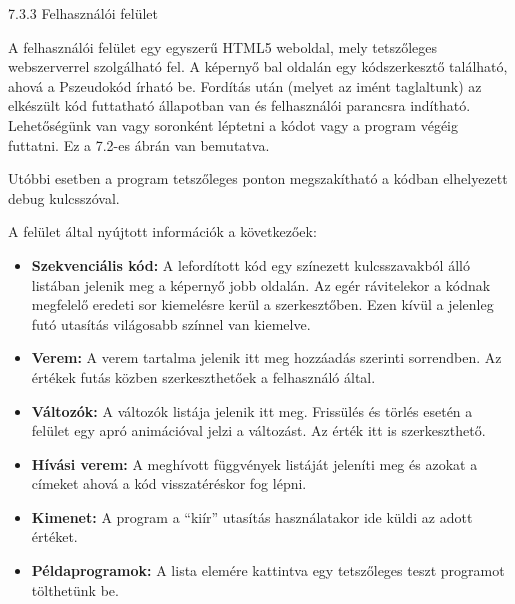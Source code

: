 7.3.3 Felhasználói felület

A felhasználói felület egy egyszerű HTML5 weboldal, mely tetszőleges webszerverrel szolgálható fel. A képernyő bal oldalán egy kódszerkesztő található, ahová a Pszeudokód írható be. Fordítás után (melyet az imént taglaltunk) az elkészült kód futtatható állapotban van és felhasználói parancsra indítható. Lehetőségünk van vagy soronként léptetni a kódot vagy a program végéig futtatni. Ez a 7.2-es ábrán van bemutatva.

Utóbbi esetben a program tetszőleges ponton megszakítható a kódban elhelyezett debug kulcsszóval.

A felület által nyújtott információk a következőek:

\begin{itemize}
    \item \textbf{Szekvenciális kód:} A lefordított kód egy színezett kulcsszavakból álló listában jelenik meg a képernyő jobb oldalán. Az egér rávitelekor a kódnak megfelelő eredeti sor kiemelésre kerül a szerkesztőben. Ezen kívül a jelenleg futó utasítás világosabb színnel van kiemelve.
    \item \textbf{Verem:} A verem tartalma jelenik itt meg hozzáadás szerinti sorrendben. Az értékek futás közben szerkeszthetőek a felhasználó által.
    \item \textbf{Változók:} A változók listája jelenik itt meg. Frissülés és törlés esetén a felület egy apró animációval jelzi a változást. Az érték itt is szerkeszthető.
    \item \textbf{Hívási verem:} A meghívott függvények listáját jeleníti meg és azokat a címeket ahová a kód visszatéréskor fog lépni.
    \item \textbf{Kimenet:} A program a “kiír” utasítás használatakor ide küldi az adott értéket.
    \item \textbf{Példaprogramok:} A lista elemére kattintva egy tetszőleges teszt programot tölthetünk be.
\end{itemize}